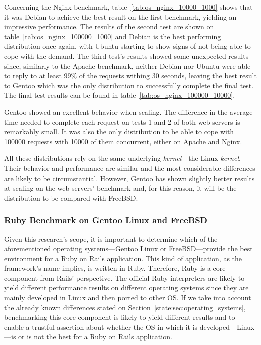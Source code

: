 Concerning the Nginx benchmark, table~\ref{tab:os_nginx_10000_1000} shows that it was Debian to achieve the best result on the first benchmark, yielding an impressive performance. The results of the second test are shown on table~\ref{tab:os_nginx_100000_1000} and Debian is the best performing distribution once again, with Ubuntu starting to show signs of not being able to cope with the demand. The third test's results showed some unexpected results since, similarly to the Apache benchmark, neither Debian nor Ubuntu were able to reply to at least 99\% of the requests withing 30 seconds, leaving the best result to Gentoo which was the only distribution to successfully complete the final test. The final test results can be found in table~\ref{tab:os_nginx_100000_10000}.

Gentoo showed an excellent behavior when scaling. The difference in the average time needed to complete each request on tests 1 and 2 of both web servers is remarkably small. It was also the only distribution to be able to cope with 100000 requests with 10000 of them concurrent, either on Apache and Nginx. 

All these distributions rely on the same underlying \textit{kernel}---the Linux \textit{kernel}. Their behavior and performance are similar and the most considerable differences are likely to be circumstantial. However, Gentoo has shown slightly better results at scaling on the web servers' benchmark and, for this reason, it will be the distribution to be compared with FreeBSD.

\subsubsection{Ruby Benchmark on Gentoo Linux and FreeBSD}
Given this research's scope, it is important to determine which of the aforementioned operating systems---Gentoo Linux or FreeBSD---provide the best environment for a Ruby on Rails application. This kind of application, as the framework's name implies, is written in Ruby. Therefore, Ruby is a core component from Rails' perspective. The official Ruby interpreters are likely to yield different performance results on different operating systems since they are mainly developed in Linux and then ported to other OS. If we take into account the already known differences stated on Section~\ref{state:sec:operating_systems}, benchmarking this core component is likely to yield different results and to enable a trustful assertion about whether the OS in which it is developed---Linux---is or is not the best for a Ruby on Rails application.

